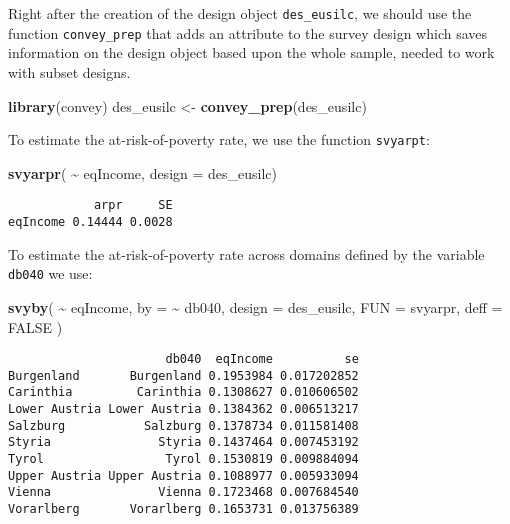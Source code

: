 \documentclass[
]{book}
\newenvironment{Shaded}{\begin{snugshade}}{\end{snugshade}}
\newcommand{\AttributeTok}[1]{\textcolor[rgb]{0.13,0.29,0.53}{#1}}
\newcommand{\ConstantTok}[1]{\textcolor[rgb]{0.56,0.35,0.01}{#1}}
\newcommand{\FunctionTok}[1]{\textcolor[rgb]{0.13,0.29,0.53}{\textbf{#1}}}
\newcommand{\NormalTok}[1]{#1}
\newcommand{\OtherTok}[1]{\textcolor[rgb]{0.56,0.35,0.01}{#1}}
\newcommand{\SpecialCharTok}[1]{\textcolor[rgb]{0.81,0.36,0.00}{\textbf{#1}}}
\begin{document}
Right after the creation of the design object \texttt{des\_eusilc}, we should use the function \texttt{convey\_prep} that adds an attribute to the survey design which saves information on the design object based upon the whole sample, needed to work with subset designs.

\begin{Shaded}
\begin{Highlighting}[]
\FunctionTok{library}\NormalTok{(convey)}
\NormalTok{des\_eusilc }\OtherTok{\textless{}{-}} \FunctionTok{convey\_prep}\NormalTok{(des\_eusilc)}
\end{Highlighting}
\end{Shaded}

To estimate the at-risk-of-poverty rate, we use the function \texttt{svyarpt}:

\begin{Shaded}
\begin{Highlighting}[]
\FunctionTok{svyarpr}\NormalTok{( }\SpecialCharTok{\textasciitilde{}}\NormalTok{ eqIncome, }\AttributeTok{design =}\NormalTok{ des\_eusilc)}
\end{Highlighting}
\end{Shaded}

\begin{verbatim}
            arpr     SE
eqIncome 0.14444 0.0028
\end{verbatim}

To estimate the at-risk-of-poverty rate across domains defined by the variable \texttt{db040} we use:

\begin{Shaded}
\begin{Highlighting}[]
\FunctionTok{svyby}\NormalTok{(}
  \SpecialCharTok{\textasciitilde{}}\NormalTok{ eqIncome,}
  \AttributeTok{by =} \SpecialCharTok{\textasciitilde{}}\NormalTok{ db040,}
  \AttributeTok{design =}\NormalTok{ des\_eusilc,}
  \AttributeTok{FUN =}\NormalTok{ svyarpr,}
  \AttributeTok{deff =} \ConstantTok{FALSE}
\NormalTok{)}
\end{Highlighting}
\end{Shaded}

\begin{verbatim}
                      db040  eqIncome          se
Burgenland       Burgenland 0.1953984 0.017202852
Carinthia         Carinthia 0.1308627 0.010606502
Lower Austria Lower Austria 0.1384362 0.006513217
Salzburg           Salzburg 0.1378734 0.011581408
Styria               Styria 0.1437464 0.007453192
Tyrol                 Tyrol 0.1530819 0.009884094
Upper Austria Upper Austria 0.1088977 0.005933094
Vienna               Vienna 0.1723468 0.007684540
Vorarlberg       Vorarlberg 0.1653731 0.013756389
\end{verbatim}
\end{document}
